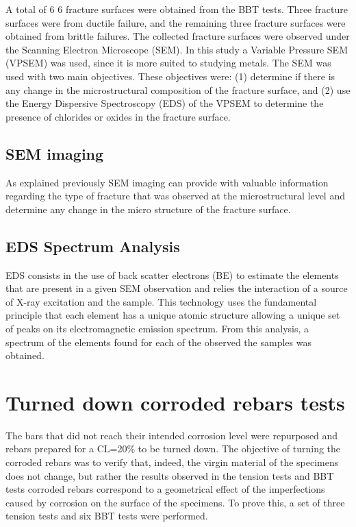 A total of 6 6 fracture surfaces were obtained from the BBT tests. Three fracture surfaces were from ductile failure, and the remaining three fracture surfaces were obtained from brittle failures. The collected fracture surfaces were observed under the Scanning Electron Microscope (SEM). In this study a Variable Pressure SEM (VPSEM) was used, since it is more suited to  studying metals.
The SEM was used with two main objectives. These objectives were: (1) determine if there is any change in the microstructural composition of the fracture surface, and (2) use the Energy Dispersive Spectroscopy (EDS) of the VPSEM to determine the presence of chlorides or oxides in the fracture surface. 

\subsection{SEM imaging}
As explained previously SEM imaging can provide with valuable information regarding the type of fracture that was observed at the microstructural level and determine any change in the micro structure of the fracture surface.

\subsection{EDS Spectrum Analysis}

EDS consists in the use of back scatter electrons (BE) to estimate the elements that are present in a given SEM observation and relies the interaction of a source of X-ray excitation and the sample. This technology uses the fundamental principle that each element has a unique atomic structure allowing a unique set of peaks on its electromagnetic emission spectrum. From this analysis, a spectrum of the elements found for each of the observed the samples was obtained. 

\section{Turned down corroded rebars tests}

The bars that did not reach their intended corrosion level were repurposed and rebars prepared for a CL=20\% to be turned down. The objective of turning the corroded rebars was to verify that, indeed, the virgin material of the specimens does not change, but rather the results observed in the tension tests and BBT tests corroded rebars correspond to a geometrical effect of the imperfections caused by corrosion on the surface of the specimens. To prove this, a set of three tension tests and six BBT tests were performed.

